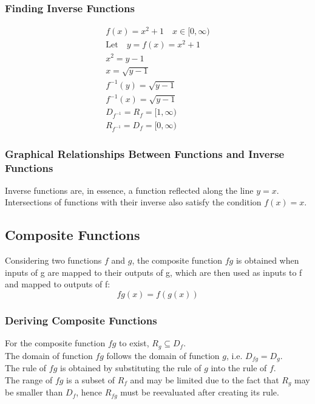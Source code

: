 \documentclass[../main]{subfiles}
\begin{document}
	\subsubsection{Finding Inverse Functions}
	\begin{equation*} \begin{gathered}
		f(x) = x^2 + 1 \quad x \in [0,\infty) \\
		\text{Let} \quad y = f(x) = x^2 + 1 \\
		x^2 = y - 1 \\
		x = \sqrt{y - 1} \\
		f^{-1}(y) = \sqrt{y-1} \\
		f^{-1}(x) = \sqrt{y-1} \\
		D_{f^{-1}} = R_f = [1,\infty) \\
		R_{f^{-1}} = D_f = [0,\infty) 
	\end{gathered} \end{equation*}
	\subsubsection{Graphical Relationships Between Functions and Inverse Functions}
	Inverse functions are, in essence, a function reflected along the line \(y=x\). \\
	Intersections of functions with their inverse also satisfy the condition \(f(x)=x\). 

\subsection{Composite Functions}
	Considering two functions \(f\) and \(g\), the composite function \(fg\) is obtained when inputs of g are mapped to their outputs of g, which are then used as inputs to f and mapped to outputs of f:
	\[ fg(x) = f(g(x)) \]
	\subsubsection{Deriving Composite Functions}
	For the composite function \(fg\) to exist, \(R_g \subseteq D_f\). \\
	The domain of function \(fg\) follows the domain of function \(g\), i.e. \(D_{fg} = D_g\). \\
	The rule of \(fg\) is obtained by substituting the rule of \(g\) into the rule of \(f\). \\
	The range of \(fg\) is a subset of \(R_f\) and may be limited due to the fact that \(R_g\) may be smaller than \(D_f\), hence \(R_{fg}\) must be reevaluated after creating its rule.
\end{document}
